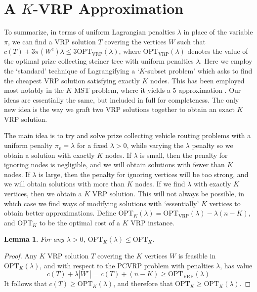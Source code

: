 \documentclass{article}
\theoremstyle{plain}
\newtheorem{lemma}{Lemma}
\theoremstyle{plain}
\begin{document}
\section{A $K$-VRP Approximation}

To summarize, in terms of uniform Lagrangian penalties $\lambda$ in place of the variable $\pi$, we can find a VRP solution $T$ covering the vertices $W$ such that $c(T) + 3 \pi(W^c) \lambda \leq 3 \text{OPT}_{\text{VRP}}(\lambda)$, where $\text{OPT}_{\text{VRP}}(\lambda)$ denotes the value of the optimal prize collecting steiner tree with uniform penalties $\lambda$. Here we employ the `standard' technique of Lagrangifying a `$K$-subset problem' which asks to find the cheapest VRP solution satisfying exactly $K$ nodes. This has been employed most notably in the $K$-MST problem, where it yields a $5$ approximation \cite{MSTLPApprox}. Our ideas are essentially the same, but included in full for completeness. The only new idea is the way we graft two VRP solutions together to obtain an exact $K$ VRP solution.

The main idea is to try and solve prize collecting vehicle routing problems with a uniform penalty $\pi_v = \lambda$ for a fixed $\lambda > 0$, while varying the $\lambda$ penalty so we obtain a solution with exactly $K$ nodes. If $\lambda$ is small, then the penalty for ignoring nodes is negligible, and we will obtain solutions with fewer than $K$ nodes. If $\lambda$ is large, then the penalty for ignoring vertices will be too strong, and we will obtain solutions with more than $K$ nodes. If we find $\lambda$ with exactly $K$ vertices, then we obtain a $K$ VRP solution. This will not always be possible, in which case we find ways of modifying solutions with `essentially' $K$ vertices to obtain better approximations. Define $\text{OPT}_K(\lambda) = \text{OPT}_{\text{VRP}}(\lambda) - \lambda (n - K)$, and $\text{OPT}_K$ to be the optimal cost of a $K$ VRP instance.

\begin{lemma}
    For any $\lambda > 0$, $\text{OPT}_K(\lambda) \leq \text{OPT}_K$.
\end{lemma}
\begin{proof}
    Any $K$ VRP solution $T$ covering the $K$ vertices $W$ is feasible in $\text{OPT}_K(\lambda)$, and with respect to the $\text{PCVRP}$ problem with penalties $\lambda$, has value
    \[ c(T) + \lambda |W^c| = c(T) + (n - K) \geq \text{OPT}_{\text{VRP}}(\lambda) \]
    It follows that $c(T) \geq \text{OPT}_K(\lambda)$, and therefore that $\text{OPT}_K \geq \text{OPT}_K(\lambda)$.
\end{proof}
\end{document}
